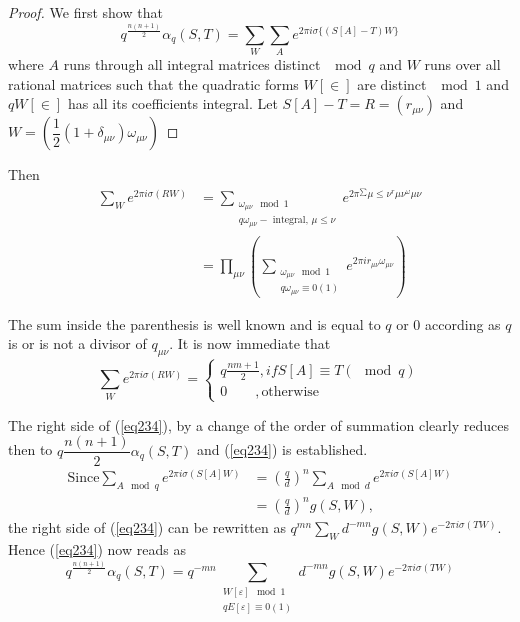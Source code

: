 \begin{proof}
We first show that 
\begin{equation*}
q^{\frac{n (n + 1)}{2}} \alpha_q (S, T) = \sum_W \sum_A e^{2 \pi i
  \sigma \{(S[A]-T)W \} } \tag{234}\label{eq234}  
\end{equation*}
where $A$ runs through all integral matrices distinct $\mod q$ and $W$
runs over all rational matrices such that the quadratic forms
$W[\in]$ are distinct $\mod 1$ and $q W[\in]$ has all
its coefficients integral. Let $S[A] - T = R = (r_{\mu \nu})$ and $W =
(\dfrac{1}{2}(1 + \delta_{\mu \nu}) \omega_{\mu \nu})$ 
\end{proof}

Then
\begin{align*} 
\sum_W e^{2 \pi i \sigma (R W)} & = \sum_{\substack{\omega_{\mu \nu}
    \mod 1 \\ q \omega_{\mu \nu} - \text{ integral, } \mu \le \nu}} 
 e^{2 \pi^{\sum} \mu \le \nu^{r} \mu \nu^{\omega} \mu \nu}\\ 
 & = \prod_{\mu \nu}( \sum_{\substack{\omega_{\mu \nu}\mod 1\\ q
     \omega_{\mu \nu} \equiv 0 (1)}} e^{2 \pi i r_{\mu \nu}
   \omega_{\mu \nu}}) 
\end{align*}\pageoriginale 

The sum inside the parenthesis is well known and is equal to $q$ or
0 according as $q$ is or is not a divisor of $q_{\mu \nu}$. It
is now immediate that  
$$
\sum_W e^{2 \pi i \sigma (R W)} = \begin{cases} q \frac{n m + 1}{2},
  if S[A] \equiv T (\mod q)\\ 0 \qquad , \text{otherwise} \end{cases} 
$$

The right side of (\ref{eq234}), by a change of the order of summation
clearly reduces then to $q \dfrac{n (n + 1)}{2} \alpha_q (S, T)$ and
(\ref{eq234}) is established. 
\begin{align*}
\text{Since} \sum_{A \mod q} e^{2 \pi i \sigma (S[A]W)} & = (
\frac{q}{d})^n \sum_{A \mod d} e^{2 \pi i \sigma (S[A]W)}\\ 
& = (\frac{q}{d})^n g (S, W),
\end{align*}
the right side of (\ref{eq234}) can be rewritten as $q^{mn} \sum\limits_{W}
d^{-mn} g(S, W) e^{-2 \pi i \sigma (T W)}$. Hence (\ref{eq234}) now reads as 
\begin{equation*}
q^{\frac{n(n + 1)}{2}} \alpha_q (S, T) = q^{-mn}
\sum_{\substack{W[\varepsilon] \mod 1 \\ q E [\varepsilon] \equiv 0
    (1) }} d^{-mn} g(S, W) e^{-2 \pi i \sigma (T W)}
\tag{235}\label{eq235}  
 \end{equation*} 
 
